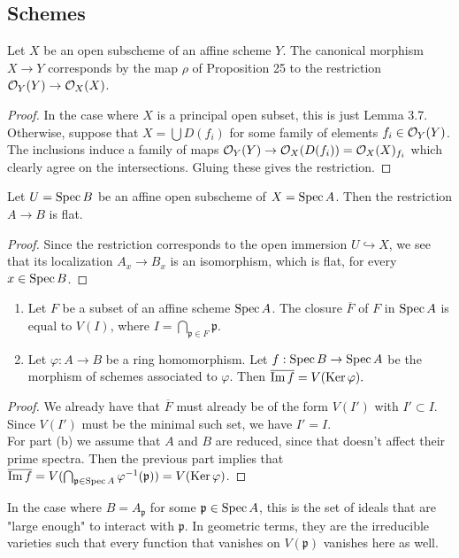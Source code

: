 \subsection{Schemes}

\begin{exer}
	Let $X$ be an open subscheme of an affine scheme $Y$. The canonical
	morphism $X \to Y$ corresponds by the map $\rho$ of Proposition 25 to
	the restriction $\mathcal{O}_Y(Y) \to \mathcal{O}_X(X)$.
\end{exer}
\begin{proof}
	In the case where $X$ is a principal open subset, this is just Lemma
	3.7. Otherwise, suppose that $X = \bigcup D(f_i)$ for some family of
	elements $f_i \in \mathcal{O}_Y(Y)$. The inclusions induce a family of maps
	$\mathcal{O}_Y(Y) \to \mathcal{O}_X(D(f_i)) = \mathcal{O}_X(X)_{f_i}$ which clearly agree on the
	intersections. Gluing these gives the restriction.
\end{proof}

\begin{exer}
	Let $U = \operatorname{Spec} B$ be an affine open subscheme of $X = \operatorname{Spec} A$. Then the
	restriction $A \to B$ is flat.
\end{exer}
\begin{proof}
	Since the restriction corresponds to the open immersion $U
	\hookrightarrow X$, we see that its localization $A_x \to B_x$ is an
	isomorphism, which is flat, for every $x \in \operatorname{Spec} B$. 
\end{proof}

\begin{exer} \leavevmode
	\begin{enumerate}[label=(\alph*)]
		\item Let $F$ be a subset of an affine scheme $\operatorname{Spec} A$. The
			closure $\overline F$ of $F$ in $\operatorname{Spec} A$ is equal to
			$V(I)$, where $I = \bigcap_{\mathfrak p \in F}
			\mathfrak p$.
		\item Let $\varphi: A \to B$ be a ring homomorphism. Let $f:
			\operatorname{Spec} B \to \operatorname{Spec} A$ be the morphism of schemes
			associated to $\varphi$. Then $\overline{\operatorname{Im} f} =
			V(\operatorname{Ker} \varphi).$
	\end{enumerate}
\end{exer}
\begin{proof}
	We already have that $\overline F$ must already be of the form $V(I')$
	with $I' \subset I$. Since $V(I')$ must be the minimal such set, we have
	$I' = I$.\\

	For part (b) we assume that $A$ and $B$ are reduced, since that doesn't
	affect their prime spectra. Then the previous part implies that
	$\overline{\operatorname{Im} f} = V(\bigcap_{\mathfrak p \in \operatorname{Spec} A} \varphi^{-1}
	(\mathfrak p)) = V(\operatorname{Ker} \varphi)$.
\end{proof}
In the case where $B = A_{\mathfrak p}$ for some $\mathfrak p \in \operatorname{Spec} A$,
this is the set of ideals that are "large enough" to interact with
$\mathfrak p$. In geometric terms, they are the irreducible varieties such that
every function that vanishes on $V(\mathfrak p)$ vanishes here as well.\\

